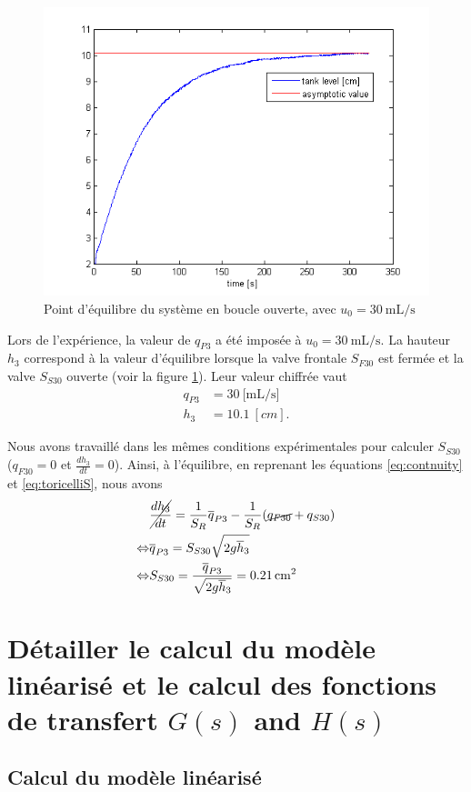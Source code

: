 \documentclass[frenchb, paper=a4, fontsize=11pt]{scrartcl}
\newcommand*\eq[1]{\overline{#1}} 				%
\numberwithin{equation}{section}					%
\numberwithin{figure}{section}					%
\numberwithin{table}{section}						%
\begin{document}
\begin{figure}[!ht]
	\centering
	\includegraphics[width=0.6\linewidth]{img/exp1_ol.png}
	\caption{Point d'équilibre du système en boucle ouverte, avec $u_0 = \SI{30}{\milli\liter\per\second}$}
	\label{fig:exp1_ol}
\end{figure}


Lors de l'expérience, la valeur de $q_{P3}$ a été imposée  à $u_0 = \SI{30}{\milli\liter\per\second}$. La hauteur $h_3$ correspond à la valeur d'équilibre lorsque la valve frontale $S_{F30}$ est fermée et la valve $S_{S30}$ ouverte (voir la figure \ref{fig:exp1_ol}). Leur valeur chiffrée vaut
\begin{align}
q_{P3} & = \SI{30}{[\milli\liter\per\second]}\\
h_3 & = \SI{10.1}{[cm]}.
\end{align}

Nous avons travaillé dans les mêmes conditions expérimentales pour calculer $S_{S30}$ ($q_{F30} = 0$ et $\frac{dh_3}{dt} = 0$). Ainsi, à l'équilibre, en reprenant les équations \ref{eq:contnuity} et \ref{eq:toricelliS}, nous avons
\begin{align}
&\cancel{\frac{dh_3}{dt}} = \frac{1}{S_R}\eq{q}_{P3} - \frac{1}{S_R}(\cancel{q_{F30}}+q_{S30})\\
\Leftrightarrow & \eq{q}_{P3} = S_{S30} \sqrt{2g\eq{h}_3} \\
\Leftrightarrow & S_{S30} = \frac{\eq{q}_{P3}}{ \sqrt{2g\eq{h}_3}} = \SI{0.21}{cm^2}
\end{align}

\section{Détailler le calcul du modèle linéarisé et le calcul des fonctions de transfert $G(s)$ and $H(s)$}

\subsection{Calcul du modèle linéarisé}
\end{document}
